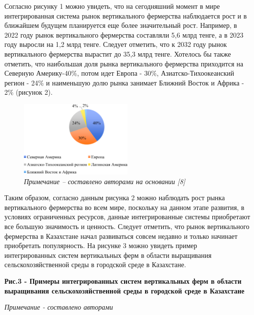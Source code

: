 \begin{multicols}{2}
Согласно рисунку 1 можно увидеть, что на сегодняшний момент в мире
интегрированная система рынок вертикального фермерства наблюдается рост
и в ближайшем будущем планируется еще более значительный рост. Например,
в 2022 году рынок вертикального фермерства составляли 5,6 млрд тенге, а
в 2023 году выросли на 1,2 млрд тенге. Следует отметить, что к 2032 году
рынок вертикального фермерства вырастит до 35,3 млрд тенге. Хотелось бы
также отметить, что наибольшая доля рынка вертикального фермерства
приходится на Северную Америку-40\%, потом идет Европа - 30\%,
Азиатско-Тихоокеанский регион - 24\% и наименьшую долю рынка занимает
Ближний Восток и Африка - 2\% (рисунок 2).
\end{multicols}

\begin{figure}[H]
	\centering
	\includegraphics[width=0.5\textwidth]{media/ekon4/image11}
	\caption*{Рис.2 - Мировая доля рынка вертикального фермерство, млрд долларов США}
	\caption*{\normalfont\emph{Примечание -- составлено авторами на основании {[}8{]}}}
\end{figure}

\begin{multicols}{2}
Таким образом, согласно данным рисунка 2 можно наблюдать рост рынка
вертикального фермерства во всем мире, поскольку на данном этапе
развития, в условиях ограниченных ресурсов, данные интегрированные
системы приобретают все большую значимость и ценность. Следует отметить,
что рынок вертикального фермерства в Казахстане начал развиваться совсем
недавно и только начинает приобретать популярность. На рисунке 3 можно
увидеть пример интегрированных систем вертикальных ферм в области
выращивания сельскохозяйственной среды в городской среде в Казахстане.
\end{multicols}

{\bfseries Рис.3 - Примеры интегрированных систем вертикальных ферм в области выращивания сельскохозяйственной среды в городской среде в Казахстане}

\emph{Примечание - составлено авторами}

